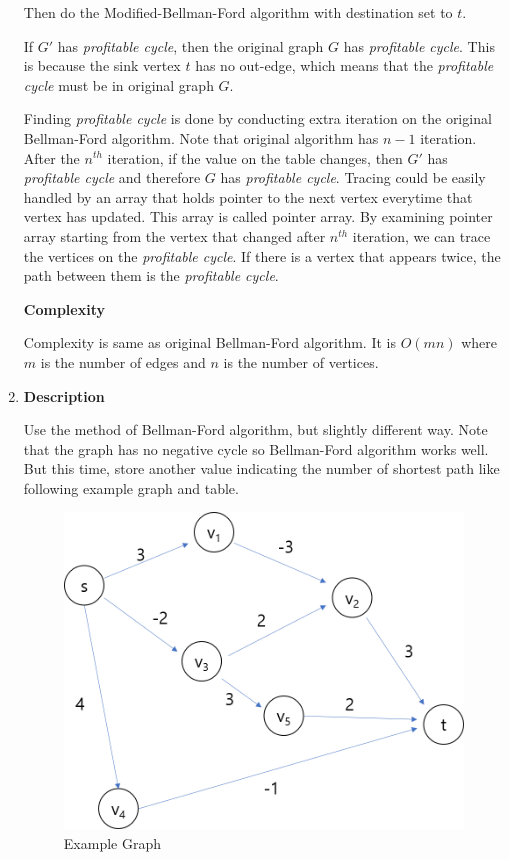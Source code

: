 \documentclass[a4paper,11pt]{article}
\begin{document}
\begin{enumerate}
Then do the Modified-Bellman-Ford algorithm with destination set to $t$.

If $G'$ has {\it profitable cycle}, then the original graph $G$ has {\it profitable cycle}. This is because the sink vertex $t$ has no out-edge, which means that the {\it profitable cycle} must be in original graph $G$.

Finding {\it profitable cycle} is done by conducting extra iteration on the original Bellman-Ford algorithm. 
Note that original algorithm has $n-1$ iteration.
After the $n^{th}$ iteration, if the value on the table changes, then $G'$ has {\it profitable cycle} and therefore $G$ has {\it profitable cycle}. 
Tracing could be easily handled by an array that holds pointer to the next vertex everytime that vertex has updated. 
This array is called pointer array. 
By examining pointer array starting from the vertex that changed after $n^{th}$ iteration, we can trace the vertices on the {\it profitable cycle}. If there is a vertex that appears twice, the path between them is the {\it profitable cycle}.

{\bf Complexity}

Complexity is same as original Bellman-Ford algorithm. It is $O(mn)$ where $m$ is the number of edges and $n$ is the number of vertices.


\item 

{\bf Description}

Use the method of Bellman-Ford algorithm, but slightly different way. Note that the graph has no negative cycle so Bellman-Ford algorithm works well. But this time, store another value indicating the number of shortest path like following example graph and table.
\begin{figure}[hbt]
	\centering
	\includegraphics[scale=0.5]{figure2.png}
	\caption{Example Graph}
\end{figure}


\end{enumerate}
\end{document}
